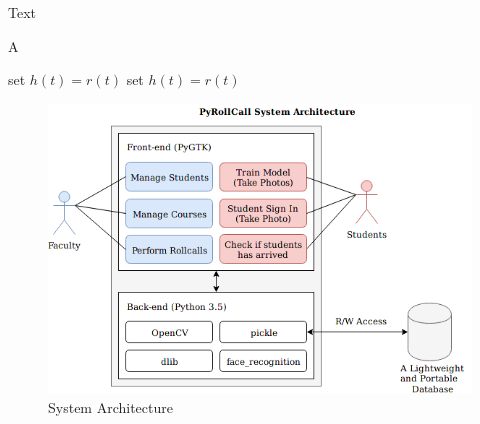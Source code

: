 Text

\begin{algorithm}
\caption{A}
\label{alg:A}
\begin{algorithmic}
\REPEAT
\STATE set $h(t)=r(t)$
\REPEAT
\STATE set $h(t)=r(t)$
\end{algorithmic}
\end{algorithm}

\begin{figure}[!htb]
  \centering
  \includegraphics[width=\linewidth]{figures/system-architecture.png}
  \caption{System Architecture}
  \label{fig:implementation}
\end{figure}
